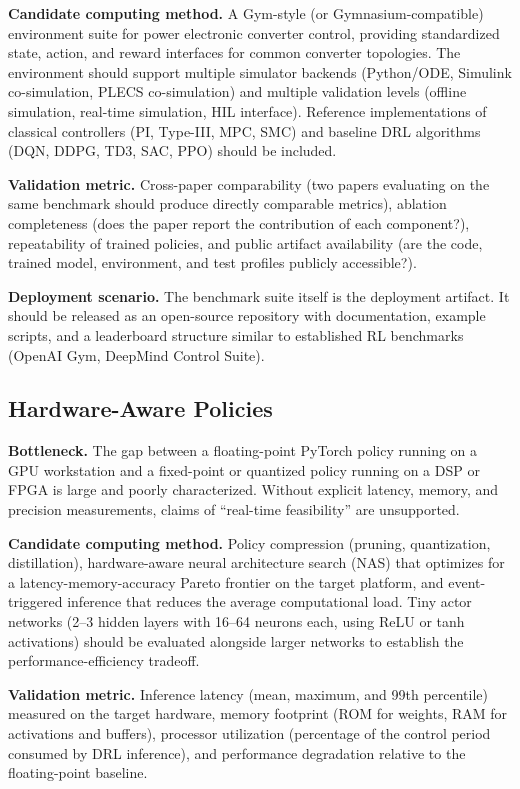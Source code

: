 \documentclass[manuscript,screen,review]{acmart}
\begin{document}
\textbf{Candidate computing method.}
A Gym-style (or Gymnasium-compatible) environment suite for power electronic converter control, providing standardized state, action, and reward interfaces for common converter topologies.
The environment should support multiple simulator backends (Python/ODE, Simulink co-simulation, PLECS co-simulation) and multiple validation levels (offline simulation, real-time simulation, HIL interface).
Reference implementations of classical controllers (PI, Type-III, MPC, SMC) and baseline DRL algorithms (DQN, DDPG, TD3, SAC, PPO) should be included.

\textbf{Validation metric.}
Cross-paper comparability (two papers evaluating on the same benchmark should produce directly comparable metrics), ablation completeness (does the paper report the contribution of each component?), repeatability of trained policies, and public artifact availability (are the code, trained model, environment, and test profiles publicly accessible?).

\textbf{Deployment scenario.}
The benchmark suite itself is the deployment artifact.
It should be released as an open-source repository with documentation, example scripts, and a leaderboard structure similar to established RL benchmarks (OpenAI Gym, DeepMind Control Suite).

\subsection{Hardware-Aware Policies}

\textbf{Bottleneck.}
The gap between a floating-point PyTorch policy running on a GPU workstation and a fixed-point or quantized policy running on a DSP or FPGA is large and poorly characterized.
Without explicit latency, memory, and precision measurements, claims of ``real-time feasibility'' are unsupported.

\textbf{Candidate computing method.}
Policy compression (pruning, quantization, distillation), hardware-aware neural architecture search (NAS) that optimizes for a latency-memory-accuracy Pareto frontier on the target platform, and event-triggered inference that reduces the average computational load.
Tiny actor networks (2--3 hidden layers with 16--64 neurons each, using ReLU or tanh activations) should be evaluated alongside larger networks to establish the performance-efficiency tradeoff.

\textbf{Validation metric.}
Inference latency (mean, maximum, and 99th percentile) measured on the target hardware, memory footprint (ROM for weights, RAM for activations and buffers), processor utilization (percentage of the control period consumed by DRL inference), and performance degradation relative to the floating-point baseline.
\end{document}
